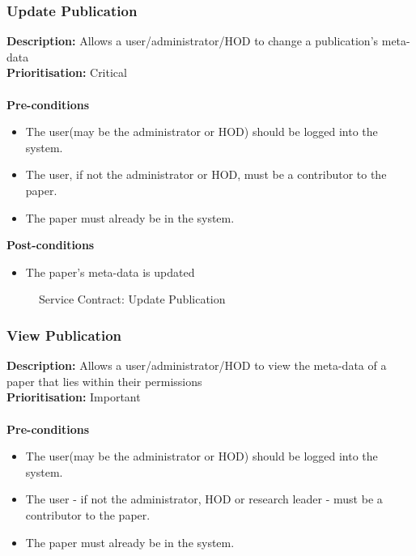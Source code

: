 \documentclass[a4paper]{article}
\begin{document}
    \subsubsection{Update Publication}
        
        \textbf{Description:} Allows a user/administrator/HOD to change a publication's meta-data\\
        \textbf{Prioritisation:} Critical\\
        \\
        
        \textbf{Pre-conditions}
         \begin{itemize}
            \item The user(may be the administrator or HOD) should be logged into the system.
            \item The user, if not the administrator or HOD, must be a contributor to the paper.
            \item The paper must already be in the system.
       \end{itemize}
        
        \textbf{Post-conditions}
        \begin{itemize}
            \item The paper's meta-data is updated
        \end{itemize}
        
            	\begin{figure}[H]
            		\centering
            		\caption{Service Contract: Update Publication}
            	\end{figure}
        \pagebreak
    \subsubsection{View Publication}
        
        \textbf{Description:} Allows a user/administrator/HOD to view the meta-data of a paper that lies within their permissions\\
        \textbf{Prioritisation:} Important\\
        \\
        
        \textbf{Pre-conditions}
         \begin{itemize}
            \item The user(may be the administrator or HOD) should be logged into the system.
            \item The user - if not the administrator, HOD or research leader - must be a contributor to the paper.
            \item The paper must already be in the system.
       \end{itemize}
        
\end{document}

